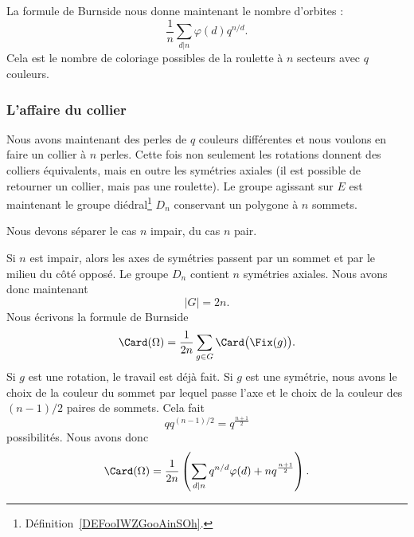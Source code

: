 La formule de Burnside nous donne maintenant le nombre d'orbites :
\begin{equation}
	\frac{1}{ n }\sum_{d|n}\varphi(d)q^{n/d}.
\end{equation}
Cela est le nombre de coloriage possibles de la roulette à \( n\) secteurs avec \( q\) couleurs.

\subsubsection{L'affaire du collier}
\label{siOQlG}

Nous avons maintenant des perles de \( q\) couleurs différentes et nous voulons en faire un collier à \( n\) perles. Cette fois non seulement les rotations donnent des colliers équivalents, mais en outre les symétries axiales (il est possible de retourner un collier, mais pas une roulette). Le groupe agissant sur \( E\) est maintenant le groupe diédral\footnote{Définition~\ref{DEFooIWZGooAinSOh}.} \( D_n\) conservant un polygone à \( n\) sommets.

Nous devons séparer le cas \( n\) impair, du cas \( n\) pair.

Si \( n\) est impair, alors les axes de symétries passent par un sommet et par le milieu du côté opposé. Le groupe \( D_n\) contient \( n\) symétries axiales. Nous avons donc maintenant
\begin{equation}
	| G |=2n.
\end{equation}
Nous écrivons la formule de Burnside
\begin{equation}
	\Card(\Omega)=\frac{1}{ 2n }\sum_{g\in G}\Card\big( \Fix(g) \big).
\end{equation}
Si \( g\) est une rotation, le travail est déjà fait. Si \( g\) est une symétrie, nous avons le choix de la couleur du sommet par lequel passe l'axe et le choix de la couleur des \( (n-1)/2\) paires de sommets. Cela fait
\begin{equation}
	qq^{(n-1)/2}=q^{\frac{ n+1 }{2}}
\end{equation}
possibilités. Nous avons donc
\begin{equation}
	\Card(\Omega)=\frac{1}{ 2n }\left( \sum_{d|n}q^{n/d}\varphi(d)+nq^{\frac{ n+1 }{2}} \right).
\end{equation}

